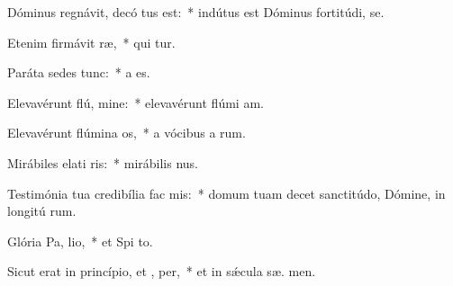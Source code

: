 \item Dóminus regnávit, decó tus est:~* indútus est Dóminus fortitúdi,   se.
\item Etenim firmávit  ræ,~* qui  tur.
\item Paráta sedes   tunc:~* a   es.
\item Elevavérunt flú, mine:~* elevavérunt flúmi  am.
\item Elevavérunt flúmina  os,~* a vócibus a rum.
\item Mirábiles elati ris:~* mirábilis   nus.
\item Testimónia tua credibília fac  mis:~* domum tuam decet sanctitúdo, Dómine, in longitú rum.
\item Glória Pa,  lio,~* et Spi to.
\item Sicut erat in princípio, et ,  per,~* et in sǽcula sæ. men.

